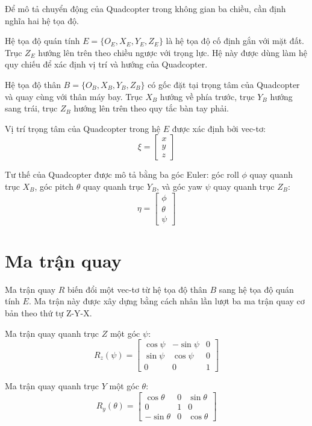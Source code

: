\documentclass[12pt,a4paper]{report}
\begin{document}
Để mô tả chuyển động của Quadcopter trong không gian ba chiều, cần định nghĩa hai hệ tọa độ.

Hệ tọa độ quán tính $E = \{O_E, X_E, Y_E, Z_E\}$ là hệ tọa độ cố định gắn với mặt đất. Trục $Z_E$ hướng lên trên theo chiều ngược với trọng lực. Hệ này được dùng làm hệ quy chiếu để xác định vị trí và hướng của Quadcopter.

Hệ tọa độ thân $B = \{O_B, X_B, Y_B, Z_B\}$ có gốc đặt tại trọng tâm của Quadcopter và quay cùng với thân máy bay. Trục $X_B$ hướng về phía trước, trục $Y_B$ hướng sang trái, trục $Z_B$ hướng lên trên theo quy tắc bàn tay phải.

Vị trí trọng tâm của Quadcopter trong hệ $E$ được xác định bởi vec-tơ:
\begin{equation}
\xi = \begin{bmatrix} x \\ y \\ z \end{bmatrix}
\end{equation}

Tư thế của Quadcopter được mô tả bằng ba góc Euler: góc roll $\phi$ quay quanh trục $X_B$, góc pitch $\theta$ quay quanh trục $Y_B$, và góc yaw $\psi$ quay quanh trục $Z_B$:
\begin{equation}
\eta = \begin{bmatrix} \phi \\ \theta \\ \psi \end{bmatrix}
\end{equation}

\section{Ma trận quay}
Ma trận quay $R$ biến đổi một vec-tơ từ hệ tọa độ thân $B$ sang hệ tọa độ quán tính $E$. Ma trận này được xây dựng bằng cách nhân lần lượt ba ma trận quay cơ bản theo thứ tự Z-Y-X.

Ma trận quay quanh trục $Z$ một góc $\psi$:
\begin{equation}
R_z(\psi) = \begin{bmatrix}
\cos\psi & -\sin\psi & 0 \\
\sin\psi & \cos\psi  & 0 \\
0        & 0         & 1
\end{bmatrix}
\end{equation}

Ma trận quay quanh trục $Y$ một góc $\theta$:
\begin{equation}
R_y(\theta) = \begin{bmatrix}
\cos\theta  & 0 & \sin\theta \\
0           & 1 & 0          \\
-\sin\theta & 0 & \cos\theta
\end{bmatrix}
\end{equation}
\end{document}
